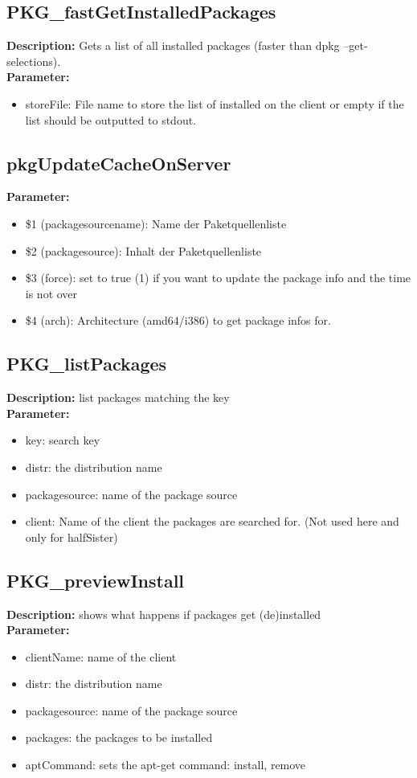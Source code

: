 \subsection{PKG\_fastGetInstalledPackages}
\textbf{Description:} Gets a list of all installed packages (faster than dpkg --get-selections).\\
\textbf{Parameter:}
\begin{itemize}
\item storeFile: File name to store the list of installed on the client or empty if the list should be outputted to stdout.
\end{itemize}

\subsection{pkgUpdateCacheOnServer}
\textbf{Parameter:}
\begin{itemize}
\item \$1 (packagesourcename): Name der Paketquellenliste
\item \$2 (packagesource): Inhalt der Paketquellenliste
\item \$3 (force): set to true (1) if you want to update the package info and the time is not over
\item \$4 (arch): Architecture (amd64/i386) to get package infos for.
\end{itemize}

\subsection{PKG\_listPackages}
\textbf{Description:} list packages matching the key\\
\textbf{Parameter:}
\begin{itemize}
\item key: search key
\item distr: the distribution name
\item packagesource: name of the package source
\item client: Name of the client the packages are searched for. (Not used here and only for halfSister)
\end{itemize}

\subsection{PKG\_previewInstall}
\textbf{Description:} shows what happens if packages get (de)installed\\
\textbf{Parameter:}
\begin{itemize}
\item clientName: name of the client
\item distr: the distribution name
\item packagesource: name of the package source
\item packages: the packages to be installed
\item aptCommand: sets the apt-get command: install, remove
\end{itemize}

